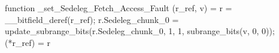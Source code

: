 function _set_Sedeleg_Fetch_Access_Fault (r_ref, v) = {
    r = __bitfield_deref(r_ref);
    r.Sedeleg_chunk_0 = update_subrange_bits(r.Sedeleg_chunk_0, 1, 1, subrange_bits(v, 0, 0));
    (*r_ref) = r
}
